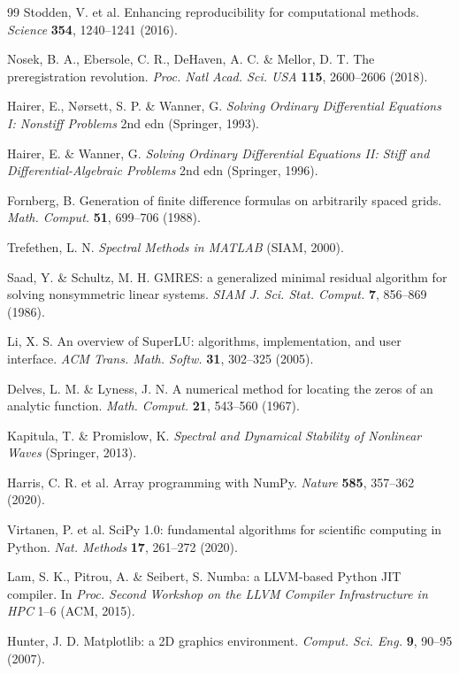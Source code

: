 \documentclass[11pt]{article}
\begin{document}
\begin{thebibliography}{99}
 Stodden, V. et al. Enhancing reproducibility for computational methods. \textit{Science}
\textbf{354}, 1240--1241 (2016).

 Nosek, B. A., Ebersole, C. R., DeHaven, A. C. \& Mellor, D. T. The preregistration revolution.
\textit{Proc. Natl Acad. Sci. USA} \textbf{115}, 2600--2606 (2018).

 Hairer, E., N{\o}rsett, S. P. \& Wanner, G. \textit{Solving Ordinary Differential Equations I:
Nonstiff Problems} 2nd edn (Springer, 1993).

 Hairer, E. \& Wanner, G. \textit{Solving Ordinary Differential Equations II: Stiff and
Differential-Algebraic Problems} 2nd edn (Springer, 1996).

 Fornberg, B. Generation of finite difference formulas on arbitrarily spaced grids.
\textit{Math. Comput.} \textbf{51}, 699--706 (1988).

 Trefethen, L. N. \textit{Spectral Methods in MATLAB} (SIAM, 2000).

 Saad, Y. \& Schultz, M. H. GMRES: a generalized minimal residual algorithm for solving
nonsymmetric linear systems. \textit{SIAM J. Sci. Stat. Comput.} \textbf{7}, 856--869 (1986).

 Li, X. S. An overview of SuperLU: algorithms, implementation, and user interface. \textit{ACM Trans.
Math. Softw.} \textbf{31}, 302--325 (2005).

 Delves, L. M. \& Lyness, J. N. A numerical method for locating the zeros of an analytic
function. \textit{Math. Comput.} \textbf{21}, 543--560 (1967).

 Kapitula, T. \& Promislow, K. \textit{Spectral and Dynamical Stability of Nonlinear Waves}
(Springer, 2013).

 Harris, C. R. et al. Array programming with NumPy. \textit{Nature} \textbf{585}, 357--362
(2020).

 Virtanen, P. et al. SciPy 1.0: fundamental algorithms for scientific computing in Python.
\textit{Nat. Methods} \textbf{17}, 261--272 (2020).

 Lam, S. K., Pitrou, A. \& Seibert, S. Numba: a LLVM-based Python JIT compiler. In \textit{Proc.
Second Workshop on the LLVM Compiler Infrastructure in HPC} 1--6 (ACM, 2015).

 Hunter, J. D. Matplotlib: a 2D graphics environment. \textit{Comput. Sci. Eng.} \textbf{9},
90--95 (2007).

\end{thebibliography}
\end{document}
